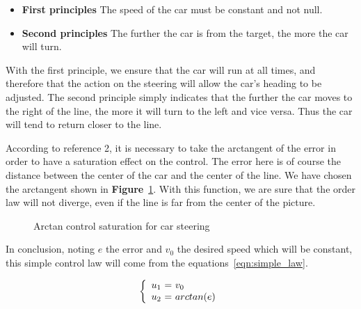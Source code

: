 \begin{itemize}
    \item \textbf{First principles} The speed of the car must be constant and not null.
    \item \textbf{Second principles} The further the car is from the target, the more the car will turn.
\end{itemize}

With the first principle, we ensure that the car will run at all times, and therefore that
the action on the steering will allow the car's heading to be adjusted. The second principle
simply indicates that the further the car moves to the right of the line, the more it will 
turn to the left and vice versa. Thus the car will tend to return closer to the line.

According to reference 2, it is necessary to take the arctangent of the error in order to
have a saturation effect on the control. The error here is of course the distance between
the center of the car and the center of the line. We have chosen the arctangent shown in
\textbf{Figure}~\ref{fig:arctan}. With this function, we are sure that the order law will
not diverge, even if the line is far from the center of the picture.

\begin{figure}[!ht]
    \begin{center}\end{center}
    \caption{Arctan control saturation for car steering}
    \label{fig:arctan}
\end{figure}

In conclusion, noting $e$ the error and $v_0$ the desired speed which will be constant,
this simple control law will come from the equations~\ref{eqn:simple_law}.

\begin{equation}
    \label{eqn:simple_law}
    \left\{
        \begin{array}{c @{=} l}
            u_1\ & \ v_0 \\
            u_2\ & \ arctan(e)
        \end{array}
    \right. 
\end{equation}

